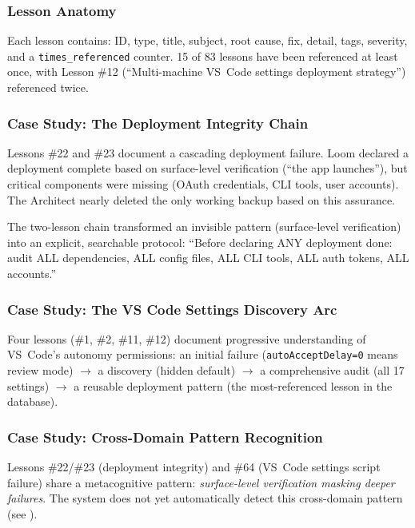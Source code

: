 \documentclass[11pt,a4paper]{article}
\begin{document}
\subsubsection{Lesson Anatomy}

Each lesson contains: ID, type, title, subject, root cause, fix, detail, tags, severity, and a \texttt{times\_referenced} counter. 15 of 83 lessons have been referenced at least once, with Lesson \#12 (``Multi-machine VS~Code settings deployment strategy'') referenced twice.


\subsubsection{Case Study: The Deployment Integrity Chain}

Lessons \#22 and \#23 document a cascading deployment failure. Loom declared a deployment complete based on surface-level verification (``the app launches''), but critical components were missing (OAuth credentials, CLI tools, user accounts). The Architect nearly deleted the only working backup based on this assurance.

The two-lesson chain transformed an invisible pattern (surface-level verification) into an explicit, searchable protocol: ``Before declaring ANY deployment done: audit ALL dependencies, ALL config files, ALL CLI tools, ALL auth tokens, ALL accounts.''


\subsubsection{Case Study: The VS Code Settings Discovery Arc}

Four lessons (\#1, \#2, \#11, \#12) document progressive understanding of VS~Code's autonomy permissions: an initial failure (\texttt{autoAcceptDelay=0} means review mode) $\to$ a discovery (hidden default) $\to$ a comprehensive audit (all 17 settings) $\to$ a reusable deployment pattern (the most-referenced lesson in the database).


\subsubsection{Case Study: Cross-Domain Pattern Recognition}

Lessons \#22/\#23 (deployment integrity) and \#64 (VS~Code settings script failure) share a metacognitive pattern: \emph{surface-level verification masking deeper failures}. The system does not yet automatically detect this cross-domain pattern (see ).
\end{document}
